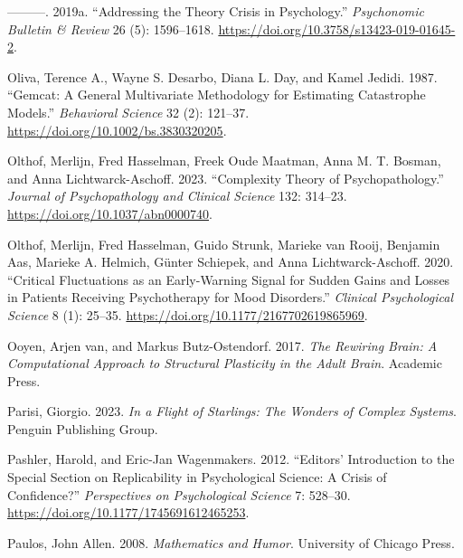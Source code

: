 \documentclass[
  a4paper,
  DIV=11,
  numbers=noendperiod]{scrreprt}
\newlength{\cslhangindent}
\newlength{\cslentryspacingunit} %
\newenvironment{CSLReferences}[2] %
 {%
  \setlength{\parindent}{0pt}
  \ifodd #1
  \let\oldpar\par
  \def\par{\hangindent=\cslhangindent\oldpar}
  \fi
  \setlength{\parskip}{#2\cslentryspacingunit}
 }%
 {}
\begin{document}
\begin{CSLReferences}{1}{0}
\leavevmode{}%
---------. 2019a. {``Addressing the Theory Crisis in Psychology.''}
\emph{Psychonomic Bulletin \& Review} 26 (5): 1596--1618.
\url{https://doi.org/10.3758/s13423-019-01645-2}.

\leavevmode{}%
Oliva, Terence A., Wayne S. Desarbo, Diana L. Day, and Kamel Jedidi.
1987. {``Gemcat: {A} General Multivariate Methodology for Estimating
Catastrophe Models.''} \emph{Behavioral Science} 32 (2): 121--37.
\url{https://doi.org/10.1002/bs.3830320205}.

\leavevmode{}%
Olthof, Merlijn, Fred Hasselman, Freek Oude Maatman, Anna M. T. Bosman,
and Anna Lichtwarck-Aschoff. 2023. {``Complexity Theory of
Psychopathology.''} \emph{Journal of Psychopathology and Clinical
Science} 132: 314--23. \url{https://doi.org/10.1037/abn0000740}.

\leavevmode{}%
Olthof, Merlijn, Fred Hasselman, Guido Strunk, Marieke van Rooij,
Benjamin Aas, Marieke A. Helmich, Günter Schiepek, and Anna
Lichtwarck-Aschoff. 2020. {``Critical {Fluctuations} as an
{Early-Warning Signal} for {Sudden Gains} and {Losses} in {Patients
Receiving Psychotherapy} for {Mood Disorders}.''} \emph{Clinical
Psychological Science} 8 (1): 25--35.
\url{https://doi.org/10.1177/2167702619865969}.

\leavevmode{}%
Ooyen, Arjen van, and Markus Butz-Ostendorf. 2017. \emph{The {Rewiring
Brain}: {A Computational Approach} to {Structural Plasticity} in the
{Adult Brain}}. {Academic Press}.

\leavevmode{}%
Parisi, Giorgio. 2023. \emph{In a Flight of Starlings: The Wonders of
Complex Systems}. Penguin Publishing Group.

\leavevmode{}%
Pashler, Harold, and Eric-Jan Wagenmakers. 2012. {``Editors'
Introduction to the Special Section on Replicability in Psychological
Science: {A} Crisis of Confidence?''} \emph{Perspectives on
Psychological Science} 7: 528--30.
\url{https://doi.org/10.1177/1745691612465253}.

\leavevmode{}%
Paulos, John Allen. 2008. \emph{Mathematics and {Humor}}. {University of
Chicago Press}.


\end{CSLReferences}
\end{document}
